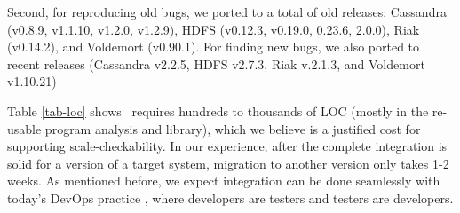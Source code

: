 Second, for reproducing old bugs, we ported \sck to a total of \numVersOld
old releases:
%
\numVersCass Cassandra (v0.8.9, v1.1.10, v1.2.0, v1.2.9),
%
\numVersHDFS HDFS (v0.12.3, v0.19.0, 0.23.6, 2.0.0),
\numVersRiak Riak (v0.14.2), and
%
\numVersVold Voldemort (v0.90.1).
%
For finding new bugs, we also ported \sck to \numVersNew recent releases
(Cassandra v2.2.5, HDFS v2.7.3, Riak v.2.1.3, and Voldemort v1.10.21)



%
Table \ref{tab-loc} shows \sck\ requires
hundreds to thousands of LOC (mostly in the re-usable program analysis
and library), which we
believe is a justified cost for supporting scale-checkability.  In our
experience, after the complete \sck integration is solid for a version of
a target system, migration to another version only takes 1-2 weeks.
%
As mentioned before, we expect \sck integration can be done seamlessly
with today's DevOps practice \cite{Limoncelli+11-Devops}, where developers
are testers and testers are developers.




